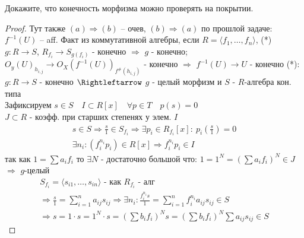 \begin{prob}
Докажите, что конечность морфизма можно проверять на покрытии.
\end{prob}
\begin{proof}
Тут также $(a) \Rightarrow (b)$ -- очев, $(b) \Rightarrow (a)$ по прошлой задаче: $f^{-1}(U)$ -- aff. Факт из коммутативной алгебры, если $R = \langle f_1, \ldots, f_n \rangle$, (*) $g: R \to S$, $R_{f_i} \to S_{g(f_i)}$ - конечно $\Rightarrow$ $g$ - конечно; $O_y(U)_{h_{i,j}} \to O_X(f^{-1}(U))_{f^{\#}(h_{i,j})}$ - конечно $\Rightarrow$ $f^{-1}(U) \to U$ - конечно
\vskip 0.2in \noindent
(*): $g: R \to S$ - конечно $\Rightleftarrow$ $g$ - целый морфизм и $S$ - $R$-алгебра кон. типа\\
Зафиксируем $s \in S\quad I \subset R[x]\quad \forall p \in T\quad p(s) = 0$\\
$J \subset R$ - коэфф. при старших степенях у элем. $I$
\begin{gather*}
    s \in S
    \Rightarrow \frac{s}{1} \in S_{f_i}
    \Rightarrow \exists p_i \in R_{f_i}[x]:\ p_i(\frac{s}{1}) = 0\\
    \exists n_i: (f_i^{n_i} p_i) \in R[x]
    \Rightarrow f_i^{n_i} p_i \in I
\end{gather*}
так как $1 = \sum a_i f_i$ то $\exists N$ - достаточно большой что: $1 = 1^N = (\sum a_i f_i)^N \in J$ $\Rightarrow$ $g$-целый\\
\begin{gather*}
    S_{f_i} = \langle s_{i1}, \ldots, s_{in} \rangle \text{ - как } R_{f_i} \text{ - алг}\\
    \Rightarrow \frac{s}{1} = \sum_{i = 1}^{n} a_{ij} s_{ij}
    \Rightarrow \exists n_i: \frac{f_i^{n_i} s}{1} = \sum_{i=1}^{n} f_i^{n_i} a_{ij} s_{ij} \in S\\
    \Rightarrow s = 1 \cdot s
    = 1^{N} \cdot s
    = (\sum b_i f_i)^N s
    = (\sum b_i f_i)^N \sum a_{ij} s_{ij} \in S
\end{gather*}
\end{proof}
\vskip 0.6in





